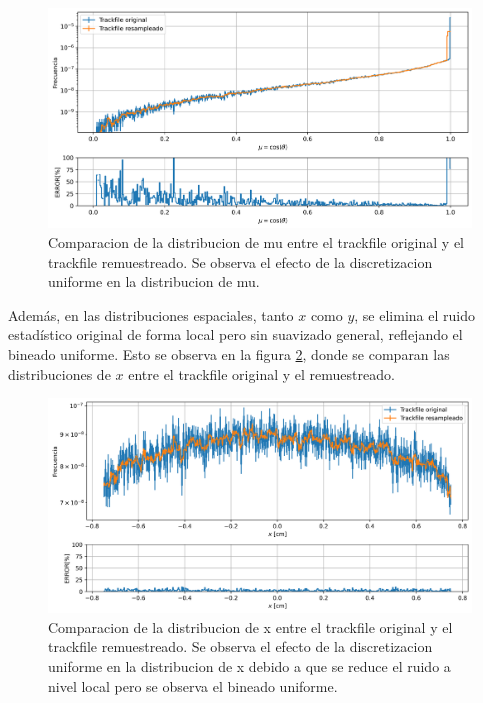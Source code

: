 \begin{figure}[h]
    \centering
    \includegraphics[width=\textwidth]{figs/fig2_5.png}
    \caption{Comparacion de la distribucion de mu entre el trackfile original y el trackfile remuestreado. Se observa el efecto de la discretizacion uniforme en la distribucion de mu.}
    \label{fig:trackfile1_config1_mu}
\end{figure}

Además, en las distribuciones espaciales, tanto $x$ como $y$, se elimina el ruido estadístico original de forma local pero sin suavizado general, reflejando el bineado uniforme. Esto se observa en la figura \ref{fig:trackfile1_config1_x}, donde se comparan las distribuciones de $x$ entre el trackfile original y el remuestreado. 

\begin{figure}[h]
    \centering
    \includegraphics[width=\textwidth]{figs/fig2_6.png}
    \caption{Comparacion de la distribucion de x entre el trackfile original y el trackfile remuestreado. Se observa el efecto de la discretizacion uniforme en la distribucion de x debido a que se reduce el ruido a nivel local pero se observa el bineado uniforme.}
    \label{fig:trackfile1_config1_x}
\end{figure}

